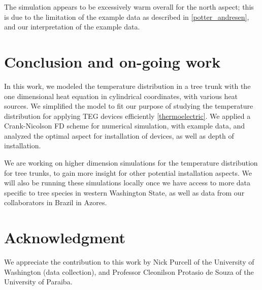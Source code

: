 \documentclass{IEEEtran} %
\begin{document}
The simulation appears to be excessively warm overall for the north aspect; this is due to the limitation of the example data as described in \ref{potter_andresen}, and our interpretation of the example data. %

\section{Conclusion and on-going work}
In this work, we modeled the temperature distribution in a tree trunk with the one dimensional heat equation in cylindrical coordinates, with various heat sources. We simplified the model to fit our purpose of studying the temperature distribution for applying TEG devices efficiently \ref{thermoelectric}. We applied a Crank-Nicolson FD scheme for numerical simulation, with example data, and analyzed the optimal aspect for installation of devices, as well as depth of installation. 

We are working on higher dimension simulations for the temperature distribution for tree trunks, to gain more insight for other potential installation aspects. We will also be running these simulations locally once we have access to more data specific to tree species in western Washington State, as well as data from our collaborators in Brazil in Azores.

\section*{Acknowledgment}
We appreciate the contribution to this work by Nick Purcell of the University of Washington (data collection), and Professor Cleonilson Protasio de Souza of the University of Paraiba.
\end{document}

